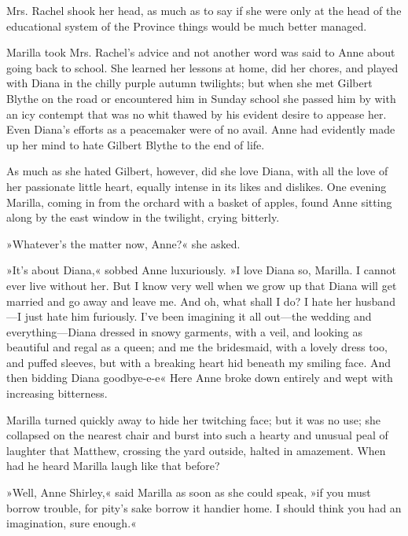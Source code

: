 Mrs. Rachel shook her head, as much as to say if she were only at the head of the educational system of the Province things would be much better managed.

Marilla took Mrs. Rachel's advice and not another word was said to Anne about going back to school. She learned her lessons at home, did her chores, and played with Diana in the chilly purple autumn twilights; but when she met Gilbert Blythe on the road or encountered him in Sunday school she passed him by with an icy contempt that was no whit thawed by his evident desire to appease her. Even Diana's efforts as a peacemaker were of no avail. Anne had evidently made up her mind to hate Gilbert Blythe to the end of life.

As much as she hated Gilbert, however, did she love Diana, with all the love of her passionate little heart, equally intense in its likes and dislikes. One evening Marilla, coming in from the orchard with a basket of apples, found Anne sitting along by the east window in the twilight, crying bitterly.

»Whatever's the matter now, Anne?« she asked.

»It's about Diana,« sobbed Anne luxuriously. »I love Diana so, Marilla. I cannot ever live without her. But I know very well when we grow up that Diana will get married and go away and leave me. And oh, what shall I do? I hate her husband—I just hate him furiously. I've been imagining it all out—the wedding and everything—Diana dressed in snowy garments, with a veil, and looking as beautiful and regal as a queen; and me the bridesmaid, with a lovely dress too, and puffed sleeves, but with a breaking heart hid beneath my smiling face. And then bidding Diana goodbye-e-e\longdash« Here Anne broke down entirely and wept with increasing bitterness.

Marilla turned quickly away to hide her twitching face; but it was no use; she collapsed on the nearest chair and burst into such a hearty and unusual peal of laughter that Matthew, crossing the yard outside, halted in amazement. When had he heard Marilla laugh like that before?

»Well, Anne Shirley,« said Marilla as soon as she could speak, »if you must borrow trouble, for pity's sake borrow it handier home. I should think you had an imagination, sure enough.«
